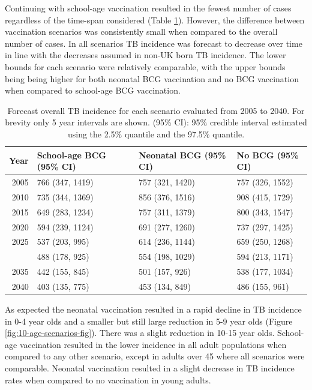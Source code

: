 \documentclass[11pt,twoside]{bristolthesis}
\begin{document}
  Continuing with school-age vaccination resulted in the fewest number of cases regardless of the time-span considered (Table \ref{tab:10-table-future-incidence}). However, the difference between vaccination scenarios was consistently small when compared to the overall number of cases. In all scenarios TB incidence was forecast to decrease over time in line with the decreases assumed in non-UK born TB incidence. The lower bounds for each scenario were relatively comparable, with the upper bounds being being higher for both neonatal BCG vaccination and no BCG vaccination when compared to school-age BCG vaccination.
  \begin{longtable}{rlll}
  \caption[Forecast overall TB incidence for each scenario evaluated from 2005 to 2040.]{\label{tab:10-table-future-incidence}Forecast overall TB incidence for each scenario evaluated from 2005 to 2040. For brevity only 5 year intervals are shown. (95\% CI): 95\% credible interval estimated using the 2.5\% quantile and the 97.5\% quantile.}\\
  \toprule
  Year & School-age BCG (95\% CI) & Neonatal BCG (95\% CI) & No BCG (95\% CI)\\
  \midrule
  2005 & 766 (347, 1419) & 757 (321, 1420) & 757 (326, 1552)\\
  2010 & 735 (344, 1369) & 856 (376, 1516) & 908 (415, 1729)\\
  2015 & 649 (283, 1234) & 757 (311, 1379) & 800 (343, 1547)\\
  2020 & 594 (239, 1124) & 691 (277, 1260) & 737 (297, 1425)\\
  2025 & 537 (203, 995) & 614 (236, 1144) & 659 (250, 1268)\\
  \addlinespace
  2030 & 488 (178, 925) & 554 (198, 1029) & 594 (213, 1171)\\
  2035 & 442 (155, 845) & 501 (157, 926) & 538 (177, 1034)\\
  2040 & 403 (135, 775) & 453 (134, 849) & 486 (155, 961)\\
  \bottomrule
  \end{longtable}
  As expected the neonatal vaccination resulted in a rapid decline in TB incidence in 0-4 year olds and a smaller but still large reduction in 5-9 year olds (Figure \ref{fig:10-age-scenarios-fig}). There was a slight reduction in 10-15 year olds. School-age vaccination resulted in the lower incidence in all adult populations when compared to any other scenario, except in adults over 45 where all scenarios were comparable. Neonatal vaccination resulted in a slight decrease in TB incidence rates when compared to no vaccination in young adults.
\end{document}
